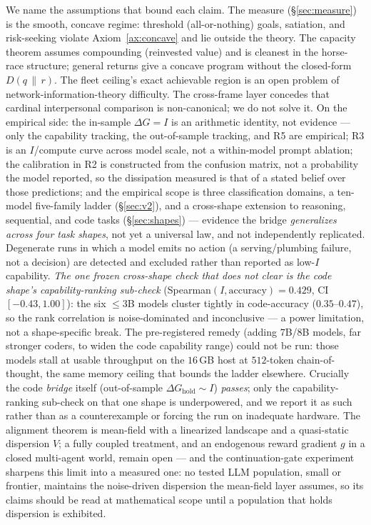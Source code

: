 \documentclass[11pt]{article}
\theoremstyle{plain}
\theoremstyle{definition}
\theoremstyle{remark}
\newcommand{\KL}[2]{D\!\left(#1\,\|\,#2\right)}
\newcommand{\I}{I}
\begin{document}
We name the assumptions that bound each claim. The measure (\S\ref{sec:measure}) is the smooth, concave regime:
threshold (all-or-nothing) goals, satiation, and risk-seeking violate Axiom~\ref{ax:concave} and lie outside
the theory. The capacity theorem assumes compounding (reinvested value) and is
cleanest in the horse-race structure; general returns give a concave program without the closed-form
$\KL{q}{r}$. The fleet ceiling's exact achievable region is an open problem of network-information-theory
difficulty. The cross-frame layer concedes that cardinal interpersonal comparison is non-canonical; we do not
solve it. On the empirical side: the in-sample $\Delta G=\I$ is an arithmetic identity, not evidence ---only the
capability tracking, the out-of-sample tracking, and R5 are empirical; R3 is an $\I$/compute curve across model
scale, not a within-model prompt ablation; the calibration in R2 is constructed from the confusion matrix, not a
probability the model reported, so the dissipation measured is that of a stated belief over those predictions;
and the empirical scope is three classification domains, a ten-model five-family ladder (\S\ref{sec:v2}), and a
cross-shape extension to reasoning, sequential, and code tasks (\S\ref{sec:shapes}) --- evidence the bridge
\emph{generalizes across four task shapes}, not yet a universal law, and not independently replicated.
Degenerate runs in which a model emits no action (a serving/plumbing failure, not a decision) are detected and
excluded rather than reported as low-$\I$ capability. \emph{The one frozen cross-shape check that does not
clear is the code shape's capability-ranking sub-check} (Spearman$(\I,\text{accuracy})=0.429$, CI
$[-0.43,1.00]$): the six $\le\!3$B models cluster tightly in code-accuracy ($0.35$--$0.47$), so the rank
correlation is noise-dominated and inconclusive --- a power limitation, not a shape-specific break. The
pre-registered remedy (adding $7$B/$8$B models, far stronger coders, to widen the code capability range) could
not be run: those models stall at usable throughput on the $16$\,GB host at $512$-token chain-of-thought, the
same memory ceiling that bounds the ladder elsewhere. Crucially the code \emph{bridge} itself
(out-of-sample $\Delta G_{\text{hold}}\sim\I$) \emph{passes}; only the capability-ranking sub-check on that one
shape is underpowered, and we report it as such rather than as a counterexample or forcing the run on
inadequate hardware. The alignment theorem is mean-field with a linearized
landscape and a quasi-static dispersion $V$; a fully coupled treatment, and an endogenous reward gradient $g$ in
a closed multi-agent world, remain open --- and the continuation-gate experiment sharpens this limit into a
measured one: no tested LLM population, small or frontier, maintains the noise-driven dispersion the mean-field
layer assumes, so its claims should be read at mathematical scope until a population that holds dispersion is
exhibited.
\end{document}
